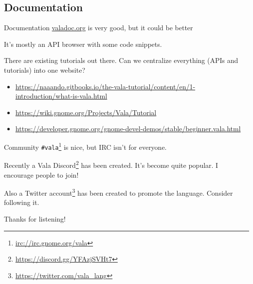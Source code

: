 \documentclass[t]{beamer}
\newcommand{\fancyurl}[1]{\href{#1}{#1}}
\begin{document}
\subsection{Documentation}
\begin{frame}[c]{Documentation}
    \href{https://valadoc.org}{valadoc.org} is very good, but it could be better
    
    It's mostly an API browser with some code snippets.
    
    There are existing tutorials out there. Can we centralize everything (APIs and tutorials) into one website?
    
    \begin{itemize}
        \item \fancyurl{https://naaando.gitbooks.io/the-vala-tutorial/content/en/1-introduction/what-is-vala.html}
        \item \fancyurl{https://wiki.gnome.org/Projects/Vala/Tutorial}
        \item \fancyurl{https://developer.gnome.org/gnome-devel-demos/stable/beginner.vala.html}
    \end{itemize}
\end{frame}

\begin{frame}[c]{Community}
    \texttt{\#vala}\footnote{\fancyurl{irc://irc.gnome.org/vala}} is nice, but IRC isn't for everyone.
    
    Recently a Vala Discord\footnote{\fancyurl{https://discord.gg/YFAzjSVHt7}} has been created. It's become quite popular. I encourage people to join!
    
    Also a Twitter account\footnote{\fancyurl{https://twitter.com/vala\_lang}} has been created to promote the language. Consider following it.
    
    Thanks for listening!
\end{frame}
\end{document}
